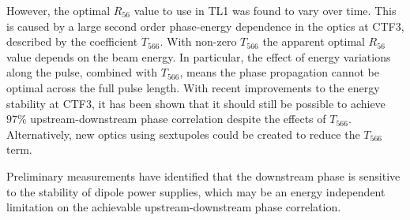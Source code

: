 However, the optimal \(R_{56}\) value to use in TL1 was found to vary over time. This is caused by a large second order phase-energy dependence in the optics at CTF3, described by the coefficient \(T_{566}\). With non-zero \(T_{566}\) the apparent optimal \(R_{56}\) value depends on the beam energy. In particular, the effect of energy variations along the pulse, combined with \(T_{566}\), means the phase propagation cannot be optimal across the full pulse length. With recent improvements to the energy stability at CTF3, it has been shown that it should still be possible to achieve \(97\%\) upstream-downstream phase correlation despite the effects of \(T_{566}\). Alternatively, new optics using sextupoles could be created to reduce the \(T_{566}\) term.

Preliminary measurements have identified that the downstream phase is sensitive to the stability of dipole power supplies, which may be an energy independent limitation on the achievable upstream-downstream phase correlation.